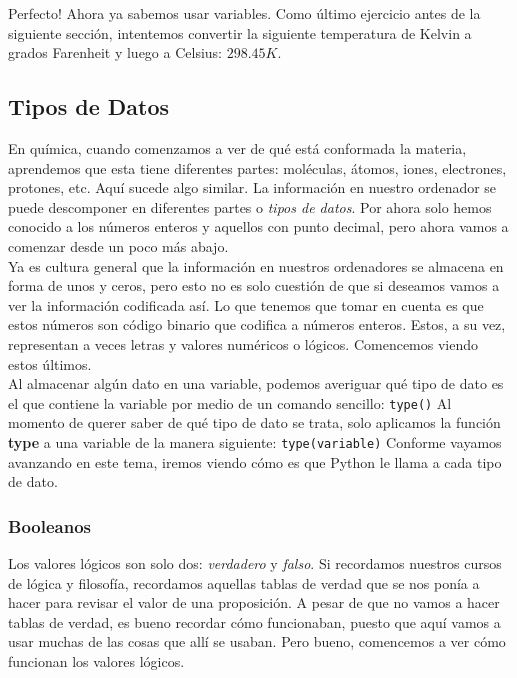 \documentclass[10pt,letterpaper]{article}
\newcommand{\inlinecode}[1]{
\colorbox{light-gray}{\texttt{#1}}
}
\begin{document}
Perfecto! Ahora ya sabemos usar variables. Como \'ultimo ejercicio antes de la siguiente secci\'on, intentemos convertir la siguiente temperatura de Kelvin a grados Farenheit y luego a Celsius: $298.45 K$.

\subsection{Tipos de Datos}
En qu\'imica, cuando comenzamos a ver de qu\'e est\'a conformada la materia, aprendemos que esta tiene diferentes partes: mol\'eculas, \'atomos, iones, electrones, protones, etc. Aqu\'i sucede algo similar. La informaci\'on en nuestro ordenador se puede descomponer en diferentes partes o \emph{tipos de datos}. Por ahora solo hemos conocido a los n\'umeros enteros y aquellos con punto decimal, pero ahora vamos a comenzar desde un poco m\'as abajo.\\

Ya es cultura general que la informaci\'on en nuestros ordenadores se almacena en forma de unos y ceros, pero esto no es solo cuesti\'on de que si deseamos vamos a ver la informaci\'on codificada as\'i. Lo que tenemos que tomar en cuenta es que estos n\'umeros son c\'odigo binario que codifica a n\'umeros enteros. Estos, a su vez, representan a veces letras y valores num\'ericos o l\'ogicos. Comencemos viendo estos \'ultimos.\\

Al almacenar alg\'un dato en una variable, podemos averiguar qu\'e tipo de dato es el que contiene la variable por medio de un comando sencillo: \inlinecode{type()} Al momento de querer saber de qu\'e tipo de dato se trata, solo aplicamos la funci\'on \textbf{type} a una variable de la manera siguiente: \inlinecode{type(variable)} Conforme vayamos avanzando en este tema, iremos viendo c\'omo es que Python le llama a cada tipo de dato.

\subsubsection{Booleanos}
Los valores l\'ogicos son solo dos: \emph{verdadero} y \emph{falso}. Si recordamos nuestros cursos de l\'ogica y filosof\'ia, recordamos aquellas tablas de verdad que se nos pon\'ia a hacer para revisar el valor de una proposici\'on. A pesar de que no vamos a hacer tablas de verdad, es bueno recordar c\'omo funcionaban, puesto que aqu\'i vamos a usar muchas de las cosas que all\'i se usaban. Pero bueno, comencemos a ver c\'omo funcionan los valores l\'ogicos.\\
\end{document}

